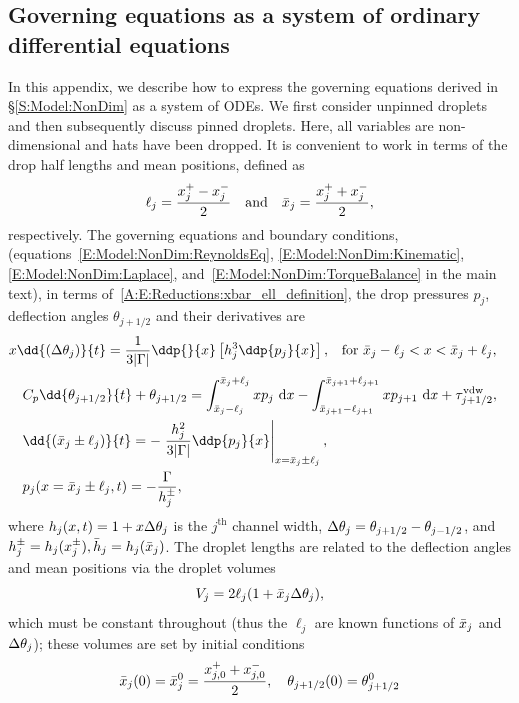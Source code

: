 \begin{subappendices}
\renewcommand{\thesection}{\Alph{section}}
\section{Governing equations as a system of ordinary differential equations}\label{Appendix:Reduction}

In this appendix, we describe how to express the governing equations derived in \S\ref{S:Model:NonDim} as a system of ODEs. We first consider unpinned droplets and then subsequently discuss pinned droplets. Here, all variables are non-dimensional and hats have been dropped.\newline
It is convenient to work in terms of the drop half lengths and mean positions, defined as
\begin{equation}\label{A:E:Reductions:xbar_ell_definition}
\ell_j = \frac{x_{j}^{+} - x_{j}^{-}}{2}\quad\text{and}\quad \bar{x}_j = \frac{x_{j}^{+} + x_{j}^{-}}{2},
\end{equation}
respectively. The governing equations and boundary conditions, (equations~\eqref{E:Model:NonDim:ReynoldsEq}, \eqref{E:Model:NonDim:Kinematic}, \eqref{E:Model:NonDim:Laplace}, and~\eqref{E:Model:NonDim:TorqueBalance} in the main text), in terms of~\eqref{A:E:Reductions:xbar_ell_definition}, the drop pressures $p_j$, deflection angles $\theta_{j+1/2}$ and their derivatives are
\begin{align}\label{A:Eq:Reduction:Reynolds}
x\dd{\left(\dthetaj\right)}{t} &= \frac{1}{3|\Gamma|}\ddp{ }{x}\left[h_j^3 \ddp{p_j}{x}\right],& &\text{for}~\xbarj -\ellj < x < \xbarj + \ellj,
\end{align}
\begin{align}
& C_p\dd{\theta_{j+1/2}}{t} + \theta_{j+1/2} = \int^{\xbarj + \ellj}_{\xbarj - \ellj} x p_j~\mathrm{d}x -  \int^{\bar{x}_{j+1}+ \ell_{j+1}}_{\bar{x}_{j+1}- \ell_{j+1}} x p_{j+1}~\mathrm{d}x +\tau^{\text{vdw}}_{j+1/2},\label{A:Eq:Reduction:Torque}\\
&\dd{\left(\xbar_j \pm \ell_j\right)}{t} = -\left.\frac{h_j^2}{3|\Gamma|}\ddp{p_j}{x}\right|_{x = \xbar_j \pm \ell_j},\label{A:Eq:Reduction:Kinematic}\\
&p_j(x = \xbar_j \pm \ell_j, t) = -\frac{\Gamma}{h_j^{\pm}}\label{A:Eq:Reduction:PressureBC},
\end{align}
where $h_j(x,t) = 1 +x \Delta \theta_j$ is the $j^{\text{th}}$ channel width, $\Delta \theta_j =\theta_{j+1/2}- \theta_{j-1/2}$,  and $h_j^{\pm} = h_j(x_j^{\pm}), \bar{h}_j = h_j(\bar{x}_j)$. The droplet lengths are related to the deflection angles and mean positions via the droplet volumes
\begin{equation}\label{A:Eq:Reduction:Volume}
V_j = 2\ell_j(1 + \bar{x}_j \Delta \theta_j),
\end{equation}
which must be constant throughout (thus the $\ell_j$ are known functions of $\bar{x}_j$ and $\Delta \theta_j$); these volumes are set by initial conditions
\begin{equation}\label{A:Eq:Reduction:IC}
\bar{x}_j(0) = \bar{x}_j^0 = \frac{x_{j,0}^+ + x_{j,0}^-}{2}, \quad \theta_{j+1/2}(0) = \theta_{j+1/2}^0
\end{equation}


\end{subappendices}
